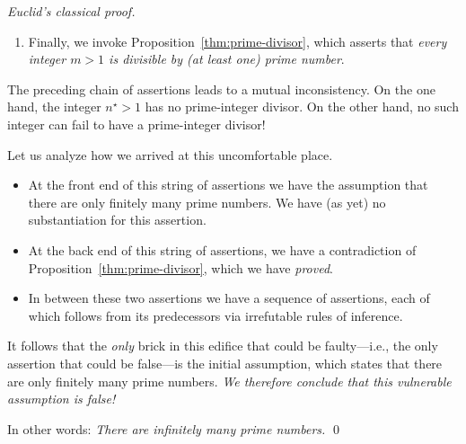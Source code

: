 \begin{proof} [Euclid's classical proof]
\begin{enumerate}
\medskip\item
Finally, we invoke Proposition~\ref{thm:prime-divisor}, which asserts that {\em every integer $m >1$ is divisible by (at least one) prime number}.
\end{enumerate}
The preceding chain of assertions leads to a mutual inconsistency.  On the one hand, the integer $n^\star >1$ has no prime-integer divisor. On the other hand, no such integer can fail to have a prime-integer divisor!

\medskip

Let us analyze how we arrived at this uncomfortable place.
\begin{itemize}
\item
At the front end of this string of assertions we have the assumption that there are only finitely many prime numbers.  We have (as yet) no substantiation for this assertion.
\medskip\item
At the back end of this string of assertions, we have a contradiction of Proposition~\ref{thm:prime-divisor}, which we have {\em proved}.

\medskip\item
In between these two assertions we have a sequence of assertions, each of which follows from its predecessors via irrefutable rules of inference.
\end{itemize}
It follows that the {\em only} brick in this edifice that could be faulty---i.e., the only assertion that could be false---is the initial assumption, which states that there are only finitely many prime
numbers.  {\em We therefore conclude that this vulnerable assumption is false!} 

\smallskip

In other words: {\em There are infinitely many prime numbers.}  \qed
\end{proof}


\smallskip

